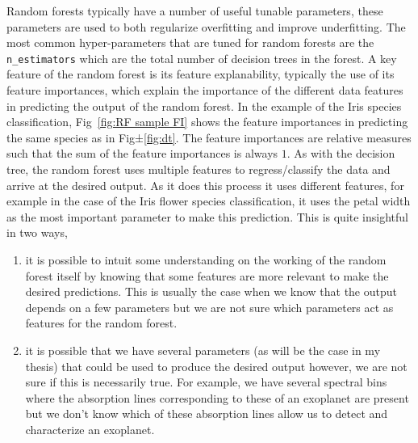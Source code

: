 Random forests typically have a number of useful tunable parameters, these parameters are used to both regularize overfitting and improve underfitting.
The most common hyper-parameters that are tuned for random forests are the \texttt{n\_estimators} which are the total number of decision trees in the forest.
A key feature of the random forest is its feature explanability, typically the use of its feature importances, which explain the importance of the different data features in predicting the output of the random forest.
In the example of the Iris species classification, Fig~\ref{fig:RF sample FI} shows the feature importances in predicting the same species as in Fig±\ref{fig:dt}.
The feature importances are relative measures such that the sum of the feature importances is always $1$.
As with the decision tree, the random forest uses multiple features to regress/classify the data and arrive at the desired output.
As it does this process it uses different features, for example in the case of the Iris flower species classification, it uses the petal width as the most important parameter to make this prediction.
This is quite insightful in two ways,
\begin{enumerate}
    \item it is possible to intuit some understanding on the working of the random forest itself by knowing that some features are more relevant to make the desired predictions.
    This is usually the case when we know that the output depends on a few parameters but we are not sure which parameters act as features for the random forest.
    \item it is possible that we have several parameters (as will be the case in my thesis) that could be used to produce the desired output however, we are not sure if this is necessarily true. 
    For example, we have several spectral bins where the absorption lines corresponding to these of an exoplanet are present but we don't know which of these absorption lines allow us to detect and characterize an exoplanet.
\end{enumerate}

